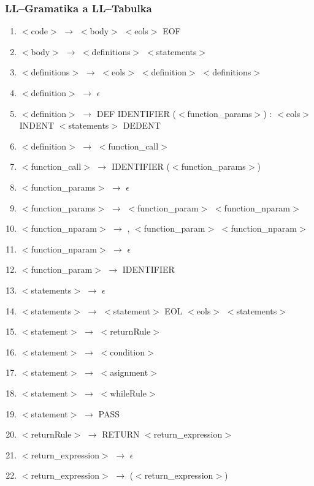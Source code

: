 \documentclass[12pt]{article}
\begin{document}
\subsubsection{LL--Gramatika a LL--Tabulka}
\begin{enumerate}
    \item $<$code$>$ $\rightarrow$ $<$body$>$  $<$eols$>$  EOF
    \item $<$body$>$ $\rightarrow$ $<$definitions$>$ $<$statements$>$
    \item $<$definitions$>$ $\rightarrow$ $<$eols$>$ $<$definition$>$ $<$definitions$>$
    \item $<$definition$>$ $\rightarrow$ $\epsilon$
    \item $<$definition$>$ $\rightarrow$ DEF IDENTIFIER ($<$function\_params$>$) : $<$eols$>$ INDENT $<$statements$>$ DEDENT
    \item $<$definition$>$ $\rightarrow$ $<$function\_call$>$
    \item $<$function\_call$>$ $\rightarrow$ IDENTIFIER ($<$function\_params$>$)
    \item $<$function\_params$>$ $\rightarrow$ $\epsilon$
    \item $<$function\_params$>$ $\rightarrow$ $<$function\_param$>$ $<$function\_nparam$>$
    \item $<$function\_nparam$>$ $\rightarrow$ , $<$function\_param$>$ $<$function\_nparam$>$
    \item $<$function\_nparam$>$ $\rightarrow$ $\epsilon$
    \item $<$function\_param$>$ $\rightarrow$ IDENTIFIER
    \item $<$statements$>$ $\rightarrow$ $\epsilon$
    \item $<$statements$>$ $\rightarrow$ $<$statement$>$ EOL $<$eols$>$ $<$statements$>$
    \item $<$statement$>$ $\rightarrow$ $<$returnRule$>$
    \item $<$statement$>$ $\rightarrow$ $<$condition$>$
    \item $<$statement$>$ $\rightarrow$ $<$asignment$>$
    \item $<$statement$>$ $\rightarrow$ $<$whileRule$>$
    \item $<$statement$>$ $\rightarrow$ PASS
    \item $<$returnRule$>$ $\rightarrow$ RETURN $<$return\_expression$>$
    \item $<$return\_expression$>$ $\rightarrow$ $\epsilon$
    \item $<$return\_expression$>$ $\rightarrow$ ($<$return\_expression$>$)

\end{enumerate}
\end{document}
